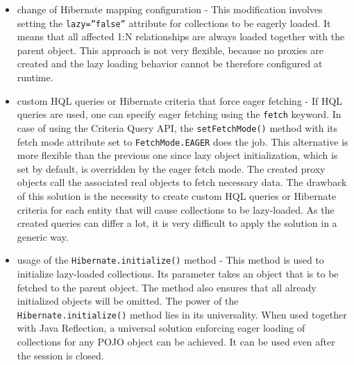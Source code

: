 \documentclass[12pt, oneside, a4paper]{book}
\begin{document}
\begin{itemize}
	\item{change of Hibernate mapping configuration}
	- This modification involves setting the \texttt{lazy=''false''} attribute for collections to be eagerly loaded. 
	It means that all affected 1:N relationships are always loaded together with the parent object. 
	This approach is not very flexible, because no proxies are created and the lazy loading behavior cannot be therefore configured at runtime.

	\item {custom HQL queries or Hibernate criteria that force eager fetching}
	- If HQL queries are used, one can specify eager fetching using the \texttt{fetch} keyword. 
	In case of using the Criteria Query API, the \texttt{setFetchMode()} method with its fetch mode attribute set to \texttt{FetchMode.EAGER} does the job.
	This alternative is more flexible than the previous one since lazy object initialization, which is set by default, is overridden by the eager fetch mode. 
	The created proxy objects call the associated real objects to fetch necessary data. 
	The drawback of this solution is the necessity to create custom HQL queries or Hibernate criteria for each entity that will cause collections to be lazy-loaded. As the created queries can differ a lot, it is very difficult to apply the solution in a generic way.
	

	\item {usage of the \texttt{Hibernate.initialize()} method} 
		- This method is used to initialize lazy-loaded collections. Its parameter takes an object that is to be fetched to the parent object.
		The method also ensures that all already initialized objects will be omitted.
		The power of the \texttt{Hibernate.initialize()} method lies in its universality. When used together with Java Reflection, a universal solution enforcing eager loading of collections for any POJO object can be achieved. 
		It can be used even after the session is closed.

\end{itemize}

%
%
%
\end{document}

